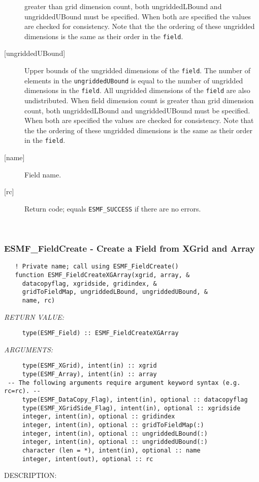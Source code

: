 \begin{description}
   greater than grid dimension count, both ungriddedLBound and ungriddedUBound
   must be specified. When both are specified the values are checked
   for consistency. Note that the the ordering of
   these ungridded dimensions is the same as their order in the {\tt field}.
   \item [{[ungriddedUBound]}]
   Upper bounds of the ungridded dimensions of the {\tt field}.
   The number of elements in the {\tt ungriddedUBound} is equal to the number of ungridded
   dimensions in the {\tt field}. All ungridded dimensions of the
   {\tt field} are also undistributed. When field dimension count is
   greater than grid dimension count, both ungriddedLBound and ungriddedUBound
   must be specified. When both are specified the values are checked
   for consistency. Note that the the ordering of
   these ungridded dimensions is the same as their order in the {\tt field}.
   \item [{[name]}]
   Field name.
   \item [{[rc]}]
   Return code; equals {\tt ESMF\_SUCCESS} if there are no errors.
   \end{description} 
 
\mbox{}\hrulefill\ 
 
\subsubsection [ESMF\_FieldCreate] {ESMF\_FieldCreate - Create a Field from XGrid and Array}


\begin{verbatim}   ! Private name; call using ESMF_FieldCreate()
   function ESMF_FieldCreateXGArray(xgrid, array, &
     datacopyflag, xgridside, gridindex, &
     gridToFieldMap, ungriddedLBound, ungriddedUBound, &
     name, rc)\end{verbatim}{\em RETURN VALUE:}
\begin{verbatim}     type(ESMF_Field) :: ESMF_FieldCreateXGArray\end{verbatim}{\em ARGUMENTS:}
\begin{verbatim}     type(ESMF_XGrid), intent(in) :: xgrid
     type(ESMF_Array), intent(in) :: array
 -- The following arguments require argument keyword syntax (e.g. rc=rc). --
     type(ESMF_DataCopy_Flag), intent(in), optional :: datacopyflag
     type(ESMF_XGridSide_Flag), intent(in), optional :: xgridside
     integer, intent(in), optional :: gridindex
     integer, intent(in), optional :: gridToFieldMap(:)
     integer, intent(in), optional :: ungriddedLBound(:)
     integer, intent(in), optional :: ungriddedUBound(:)
     character (len = *), intent(in), optional :: name
     integer, intent(out), optional :: rc\end{verbatim}
{\sf DESCRIPTION:\\ }


